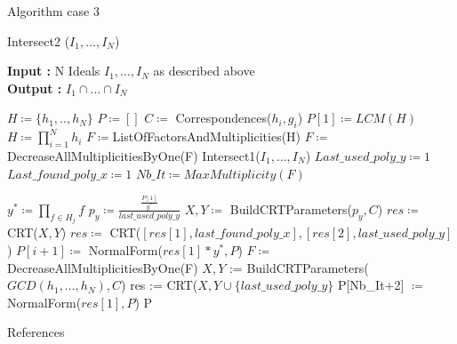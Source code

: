 \documentclass{beamer}
\begin{document}
\begin{frame}{Algorithm case 3}
    \begin{algorithm}[H]    \tiny
    \caption{Intersect2 ($I_{1},\dots,I_{N}$)}\label{alg:intersect-2-ideals-diff-gcd}
    \textbf{Input : } N Ideals $I_{1},\dots,I_{N}$ as described above \\
    \textbf{Output : }$I_{1} \cap \dots\cap I_ {N}$
\begin{algorithmic}
    \State $H \coloneqq \{h_{1},..,h_{N}\}$
    \State $P \coloneqq []$
    \State $C \coloneqq $ Correspondences($h_{i},g_{i}$) 
    \State $P[1] \coloneqq LCM(H)$
    \State $H \coloneqq \prod^{N}_{i=1} h_{i}$
    \State $F \coloneqq $ListOfFactorsAndMultiplicities(H)
    \State $F \coloneqq $DecreaseAllMultiplicitiesByOne(F)
        \State \Return Intersect1($I_{1},\dots,I_{N}$)
    \EndIf
    \State $Last\_used\_poly\_y \coloneqq 1$
    \State $Last\_found\_poly\_x \coloneqq 1$
    \State $Nb\_It \coloneqq MaxMultiplicity(F) $ 

        \State $y^{*}\coloneqq \prod_{f \in H_{j}} f$ 
        \State $p_y\coloneqq \frac{\frac{P[1]}{y^{*}}}{last\_used\_poly\_y}$ 
        \State $X, Y\coloneqq$ BuildCRTParameters($p_y, C$)
        \State $res \coloneqq $ CRT($X,Y$)
            \State $res \coloneqq $ CRT($[res[1],last\_found\_poly\_x],[res[2],last\_used\_poly\_y]$)
        \EndIf
        \State $P[i+1] \coloneqq $ NormalForm($res[1]*y^{*},P$)
        \State $F \coloneqq $ DecreaseAllMultiplicitiesByOne(F)
    \EndFor
    \State $X,Y$ := BuildCRTParameters($GCD(h_{1},\dots,h_{N}),C$)
    \State res := CRT($X,Y\cup\{last\_used\_poly\_y\}$
    \State P[Nb\_It+2] $\coloneqq $NormalForm($res[1],P$)
    \State \Return P

\end{algorithmic}
\end{algorithm}

\end{frame}

\begin{frame}{References}
    \nocite{*}
    \printbibliography
\end{frame}
\end{document}
